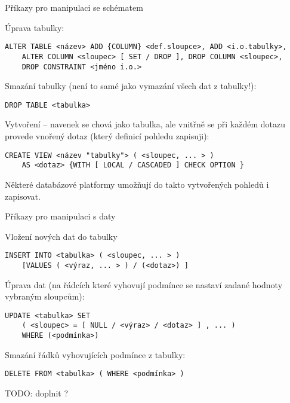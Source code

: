 \medskip
\begin{obecne}{Příkazy pro manipulaci se schématem}
\begin{pitemize}
    \item Úprava tabulky:
\begin{verbatim}
ALTER TABLE <název> ADD {COLUMN} <def.sloupce>, ADD <i.o.tabulky>, 
    ALTER COLUMN <sloupec> [ SET / DROP ], DROP COLUMN <sloupec>, 
    DROP CONSTRAINT <jméno i.o.> 
\end{verbatim}
    \item Smazání tabulky (není to samé jako vymazání všech dat z tabulky!):
\begin{verbatim}
DROP TABLE <tabulka> 
\end{verbatim}
    \item Vytvoření  -- navenek se chová jako tabulka, ale vnitřně se při každém dotazu provede vnořený dotaz (který definicí pohledu zapisuji):
\begin{verbatim}
CREATE VIEW <název "tabulky"> ( <sloupec, ... > ) 
    AS <dotaz> {WITH [ LOCAL / CASCADED ] CHECK OPTION }
\end{verbatim}
    Některé databázové platformy umožňují do takto vytvořených pohledů i zapisovat.
\end{pitemize}
\end{obecne}

\medskip
\begin{obecne}{Příkazy pro manipulaci s daty}
\begin{pitemize}
    \item Vložení nových dat do tabulky
\begin{verbatim}
INSERT INTO <tabulka> ( <sloupec, ... > ) 
    [VALUES ( <výraz, ... > ) / (<dotaz>) ] 
\end{verbatim}
    \item Úprava dat (na řádcích které vyhovují podmínce se nastaví zadané hodnoty vybraným sloupcům):
\begin{verbatim}
UPDATE <tabulka> SET 
    ( <sloupec> = [ NULL / <výraz> / <dotaz> ] , ... ) 
    WHERE (<podmínka>) 
\end{verbatim}
    \item Smazání řádků vyhovujících podmínce z tabulky:
\begin{verbatim}
DELETE FROM <tabulka> ( WHERE <podmínka> ) 
\end{verbatim}
\end{pitemize}
\end{obecne}

TODO: doplnit ?
